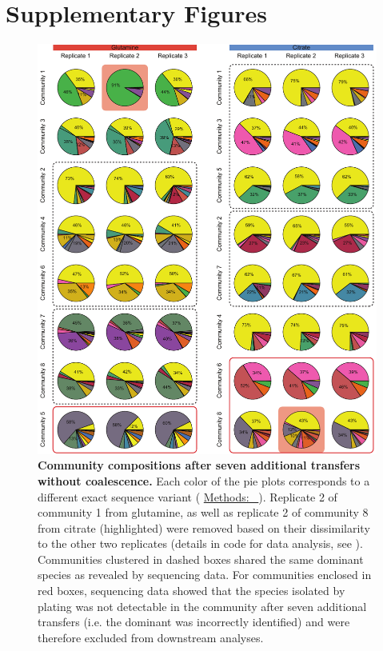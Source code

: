 \documentclass[a4paper,10pt]{article}
\newcommand{\methodsref}[1]{%
  \hyperref[{methods:#1}]{%
   Methods:~\nameref*{methods:#1}%
  }%
}
\begin{document}
\clearpage

\section*{Supplementary Figures}

\renewcommand{\thefigure}{S\arabic{figure}}
\setcounter{figure}{0} 

\begin{figure}[!h]
\centering
\internallinenumbers
\includegraphics[scale=0.9,keepaspectratio]{figs/figS1.pdf}
\caption{\textbf{Community compositions after seven additional transfers without coalescence.}
Each color of the pie plots corresponds to a different exact sequence variant
(\methodsref{sequencing}).
Replicate 2 of community 1 from glutamine,
as well as replicate 2 of community 8 from citrate (highlighted) were removed based on their
dissimilarity to the other two replicates (details in code for data analysis, see
).
Communities clustered in dashed boxes shared the same dominant species as revealed by
sequencing data.
For communities enclosed in red boxes, sequencing data showed that the species isolated by plating
was not detectable in the community after seven additional transfers (i.e. the dominant was
incorrectly identified) and were therefore excluded from downstream analyses.}
\label{figS1}
\end{figure}
\end{document}
